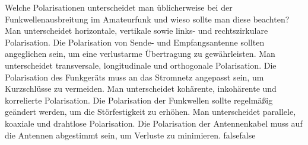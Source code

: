     {Welche Polarisationen unterscheidet man üblicherweise bei der Funkwellenausbreitung im Amateurfunk und wieso sollte man diese beachten?}
    {Man unterscheidet horizontale, vertikale sowie links- und rechtszirkulare Polarisation. Die Polarisation von Sende- und Empfangsantenne sollten angeglichen sein, um eine verlustarme Übertragung zu gewährleisten.}
    {Man unterscheidet transversale, longitudinale und orthogonale Polarisation. Die Polarisation des Funkgeräts muss an das Stromnetz angepasst sein, um Kurzschlüsse zu vermeiden.}
    {Man unterscheidet kohärente, inkohärente und korrelierte Polarisation. Die Polarisation der Funkwellen sollte regelmäßig geändert werden, um die Störfestigkeit zu erhöhen.}
    {Man unterscheidet parallele, koaxiale und drahtlose Polarisation. Die Polarisation der Antennenkabel muss auf die Antennen abgestimmt sein, um Verluste zu minimieren.}
    {false}{false}